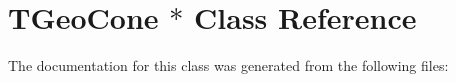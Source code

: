 \hypertarget{class_t_geo_cone_01_5}{
\section{TGeoCone $\ast$ Class Reference}
\label{class_t_geo_cone_01_5}
}


The documentation for this class was generated from the following files: